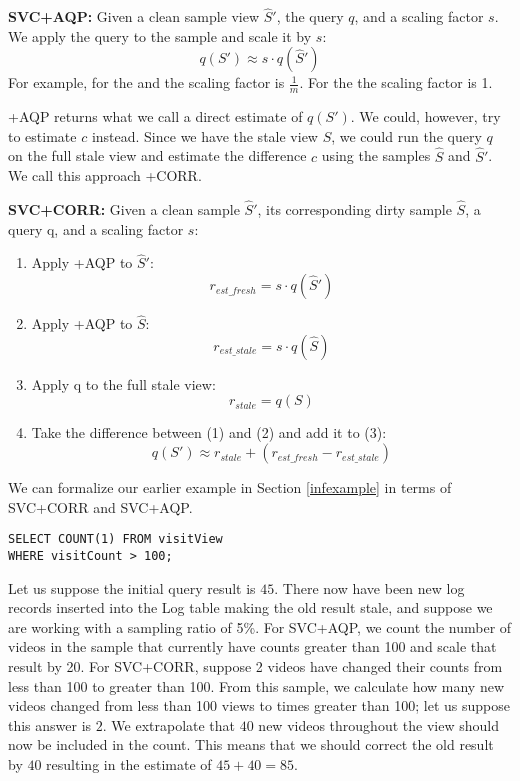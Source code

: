 \vspace{0.25em}

\noindent\textbf{SVC+AQP: }  Given a clean sample view $\widehat{S}'$, the query $q$, and a scaling factor $s$. 
We apply the query to the sample and scale it by $s$:
\[
q(S') \approx s \cdot q(\widehat{S}')
\]
For example, for the \sumfunc and \countfunc the scaling factor is $\frac{1}{m}$. For the \avgfunc the scaling factor is 1.

\svcnospace+AQP returns what we call a direct estimate of $q(S')$.
We could, however, try to estimate $c$ instead.
Since we have the stale view $S$, we could run the query $q$ on the full stale view and 
estimate the difference $c$ using the samples $\widehat{S}$ and $\widehat{S}'$.
We call this approach \svcnospace+CORR.

\vspace{0.25em}

\noindent\textbf{SVC+CORR: } Given a clean sample $\widehat{S}'$, its corresponding dirty sample $\widehat{S}$, a query q, and a scaling factor $s$:
\begin{enumerate}[noitemsep]
\item Apply \svcnospace+AQP to $\widehat{S}'$:
\[ r_{est\_fresh} = s \cdot q(\widehat{S}') \] 
\item Apply \svcnospace+AQP to $\widehat{S}$:
\[ r_{est\_stale} = s \cdot q(\widehat{S}) \] 
\item Apply q to the full stale view:
\[ r_{stale} = q(S) \]
\item Take the difference between (1) and (2) and add it to (3):
\[
q(S') \approx r_{stale} + (r_{est\_fresh} - r_{est\_stale})
\]
\end{enumerate}

\begin{example}
We can formalize our earlier example in Section \ref{infexample} in terms of SVC+CORR and SVC+AQP.
\begin{lstlisting}[basicstyle={\scriptsize}]
SELECT COUNT(1) FROM visitView 
WHERE visitCount > 100;
\end{lstlisting}
Let us suppose the initial query result is $45$.
There now have been new log records inserted into the Log table making the old result stale, and suppose we are working with a sampling ratio of 5\%.
For SVC+AQP, we count the number of videos in the sample that currently have counts greater than 100 and scale that result by 20.
For SVC+CORR, suppose 2 videos have changed their counts from less than 100 to greater than 100.
From this sample, we calculate how many new videos changed from less than 100 views to times greater than 100; let us suppose this answer is $2$.
We extrapolate that $40$ new videos throughout the view should now be included in the count.
This means that we should correct the old result by $40$ resulting in the estimate of $45+40 = 85$.
\end{example}

